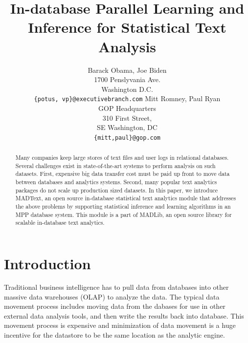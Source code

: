\documentclass[11pt,letterpaper]{article}
\title{In-database Parallel Learning and Inference for Statistical Text Analysis}
\author{Barack Obama, Joe Biden\\
1700 Penslyvania Ave.\\
Washington D.C.\\
{\tt \{potus, vp\}@executivebranch.com}
\And
Mitt Romney, Paul Ryan\\
GOP Headquarters\\
310 First Street,\\
SE Washington, DC\\
{\tt \{mitt,paul\}@gop.com}
}
\date{}
\begin{document}
\maketitle
\begin{abstract}
Many companies keep large stores of text files and user logs in relational databases.
Several challenges exist in state-of-the-art systems to perform analysis on such datasets.
First, expensive big data transfer cost must be paid up front to move data between databases
 and analytics systems. Second, many popular text analytics packages do not scale up production sized datasets.
In this paper, we introduce MADText, an open source in-database statistical text analytics module that
 addresses the above problems by supporting statistical inference and learning algorithms in an MPP database system.
This module is a part of MADLib, an open source library for scalable in-database text analytics. 

\end{abstract}

\section{Introduction}

Traditional business intelligence has to pull data from databases into other massive 
data warehouses (OLAP) to analyze the data. 
The typical data movement process includes moving data from the dabases for use in other external 
data analysis tools, and then write the results back into database.
This movement process is expensive and minimization of data movement is a huge incentive for the datastore 
to be the same location as the analytic engine.
\end{document}
